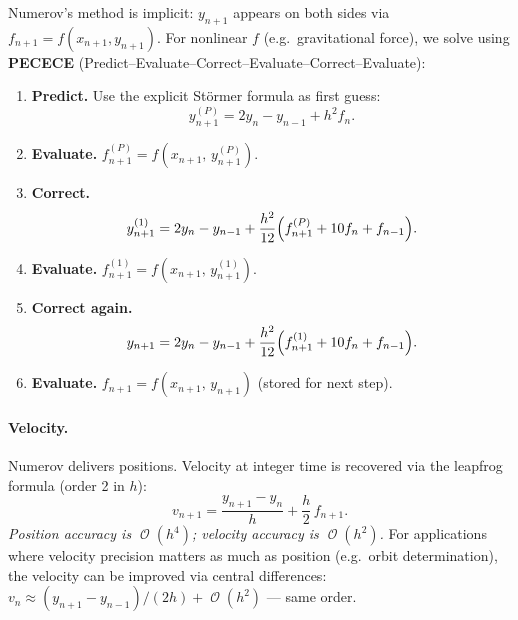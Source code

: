 \documentclass[11pt]{article}
\DeclareMathOperator{\OO}{\mathcal{O}}
\begin{document}
Numerov's method is implicit: $y_{n+1}$ appears on both sides via $f_{n+1} =
f(x_{n+1}, y_{n+1})$.  For nonlinear $f$ (e.g.\ gravitational force), we solve
using \textbf{PECECE} (Predict--Evaluate--Correct--Evaluate--Correct--Evaluate):

\begin{enumerate}
  \item \textbf{Predict.}  Use the explicit Störmer formula as first guess:
    \begin{equation}
      \label{eq:pece-predict}
      y_{n+1}^{(P)} = 2y_n - y_{n-1} + h^2 f_n.
    \end{equation}
  \item \textbf{Evaluate.}  $f_{n+1}^{(P)} = f\!\left(x_{n+1},\, y_{n+1}^{(P)}\right)$.
  \item \textbf{Correct.}
    \begin{equation}
      \label{eq:pece-correct1}
      y_{n+1}^{(1)} = 2y_n - y_{n-1}
                    + \frac{h^2}{12}\Bigl(f_{n+1}^{(P)} + 10 f_n + f_{n-1}\Bigr).
    \end{equation}
  \item \textbf{Evaluate.}  $f_{n+1}^{(1)} = f\!\left(x_{n+1},\, y_{n+1}^{(1)}\right)$.
  \item \textbf{Correct again.}
    \begin{equation}
      \label{eq:pece-correct2}
      y_{n+1} = 2y_n - y_{n-1}
              + \frac{h^2}{12}\Bigl(f_{n+1}^{(1)} + 10 f_n + f_{n-1}\Bigr).
    \end{equation}
  \item \textbf{Evaluate.}  $f_{n+1} = f\!\left(x_{n+1},\, y_{n+1}\right)$
        \quad (stored for next step).
\end{enumerate}

\paragraph{Velocity.}
Numerov delivers positions.  Velocity at integer time is recovered via the
leapfrog formula (order 2 in $h$):
\begin{equation}
  \label{eq:numerov-velocity}
  v_{n+1} = \frac{y_{n+1} - y_n}{h} + \frac{h}{2}\,f_{n+1}.
\end{equation}
\emph{Position accuracy is $\OO(h^4)$; velocity accuracy is $\OO(h^2)$.}  For
applications where velocity precision matters as much as position (e.g.\
orbit determination), the velocity can be improved via central differences:
$v_n \approx (y_{n+1} - y_{n-1})/(2h) + \OO(h^2)$ --- same order.
\end{document}
